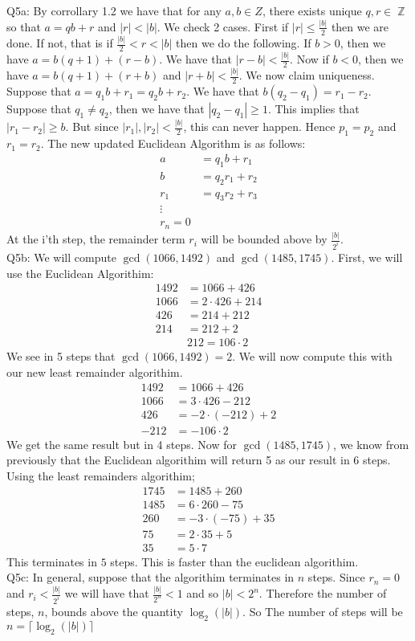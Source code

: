 \documentclass[letterpaper]{article}
\DeclareMathOperator{\Z}{\mathbb{Z}}
\begin{document}
\noindent Q5a: By corrollary 1.2 we have that for any $a,b\in Z$, there exists unique $q,r\in \Z$ so that $a=qb+r$ and $|r|< |b|$.
We check 2 cases. First if $|r|\leq \frac{|b|}{2}$ then we are done. If not, that is if $\frac{|b|}{2}<r<|b|$ then we do the following. If $b>0$, then we have $a=b(q+1)+(r-b)$. We have that $|r-b|< \frac{|b|}{2}$. 
Now if $b<0$, then we have $a=b(q+1)+(r+b)$ and $|r+b|<\frac{|b|}{2}$.
We now claim uniqueness. Suppose that $a=q_1 b+r_1 = q_2 b +r_2$. We have that $b(q_2-q_1)=r_1-r_2$. Suppose that $q_1\neq q_2$, then we have that $|q_2-q_1|\geq 1$. This implies that $|r_1-r_2|\geq b$. But since $|r_1|,|r_2|<\frac{|b|}{2}$, this can never happen. Hence $p_1=p_2$ and $r_1=r_2$.
The new updated Euclidean Algorithm is as follows: 
\begin{align*}
    a & =q_1b+r_1
   \\ b & = q_2 r_1 + r_2 
   \\ r_1 & = q_3 r_2 + r_3
   \\ \vdots
   \\ r_n = 0
\end{align*}
At the i'th step, the remainder term $r_i$ will be bounded above by $\frac{|b|}{2^i}$. 
\newline \\ Q5b: We will compute $\gcd(1066,1492)$ and $\gcd(1485,1745)$. First, we will use the Euclidean Algorithim: 
\begin{align*}
    1492 & = 1066 + 426
    \\ 1066 & = 2\cdot 426 + 214
    \\ 426  & = 214 + 212
    \\ 214 & = 212 + 2
    \\ & 212 = 106\cdot 2
\end{align*}We see in 5 steps that $\gcd(1066,1492) =2 $. We will now compute this with our new least remainder algorithim. 
\begin{align*}
    1492 &= 1066 + 426
    \\ 1066 & =  3\cdot 426 -212
    \\ 426 &   = -2\cdot (-212) + 2
    \\ -212 & = -106\cdot 2
\end{align*} We get the same result but in 4 steps.
Now for $\gcd(1485,1745)$, we know from previously that the Euclidean algorithim will return 5 as our result in 6 steps. Using the least remainders algorithim;
\begin{align*}
    1745 & = 1485 + 260
    \\ 1485 & = 6\cdot 260 -75
    \\ 260 & = -3 \cdot(-75) + 35
    \\ 75 & = 2\cdot 35 + 5
    \\ 35 & = 5\cdot 7
\end{align*}
This terminates in $5$ steps. This is faster than the euclidean algorithim. 
\newline \\ Q5c: In general, suppose that the algorithim terminates in $n$ steps. Since $r_n=0$ and $r_i<\frac{|b|}{2^i}$ we will have that $\frac{|b|}{2^n}<1$ and so $|b|<2^n$. Therefore the number of steps, $n$, bounds above the quantity $\log_2(|b|)$. So The number of steps will be $n= \lceil\log_2(|b|) \rceil$
\end{document}
